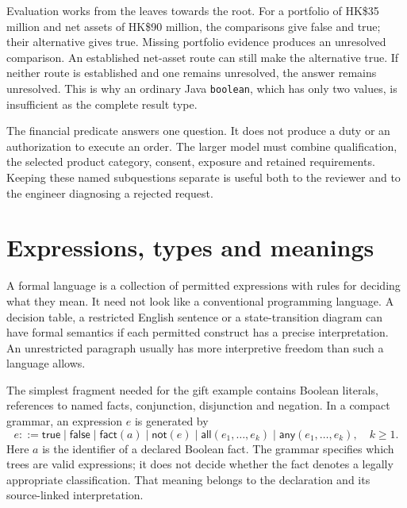 Evaluation works from the leaves towards the root. For a portfolio of HK\$35
million and net assets of HK\$90 million, the comparisons give false and true;
their alternative gives true. Missing portfolio evidence produces an unresolved
comparison. An established net-asset route can still make the alternative true.
If neither route is established and one remains unresolved, the answer remains
unresolved. This is why an ordinary Java \texttt{boolean}, which has only two
values, is insufficient as the complete result type.

The financial predicate answers one question. It does not produce a duty or an
authorization to execute an order. The larger model must combine qualification,
the selected product category, consent, exposure and retained requirements.
Keeping these named subquestions separate is useful both to the reviewer and
to the engineer diagnosing a rejected request.

\section{Expressions, types and meanings}
\label{merge:M03:04}

\label{sec:proof-language}
A formal language is a collection of permitted expressions with rules for
deciding what they mean. It need not look like a conventional programming
language. A decision table, a restricted English sentence or a state-transition
diagram can have formal semantics if each permitted construct has a precise
interpretation. An unrestricted paragraph usually has more interpretive freedom
than such a language allows.

The simplest fragment needed for the gift example contains Boolean literals,
references to named facts, conjunction, disjunction and negation. In a compact
grammar, an expression $e$ is generated by
\begin{equation}
 e ::= \mathsf{true}\mid\mathsf{false}\mid\mathsf{fact}(a)
       \mid\mathsf{not}(e)\mid\mathsf{all}(e_1,\ldots,e_k)
       \mid\mathsf{any}(e_1,\ldots,e_k),\quad k\geq 1.
 \label{eq:boolean-grammar}
\end{equation}
Here $a$ is the identifier of a declared Boolean fact. The grammar specifies
which trees are valid expressions; it does not decide whether the fact denotes
a legally appropriate classification. That meaning belongs to the declaration
and its source-linked interpretation.


